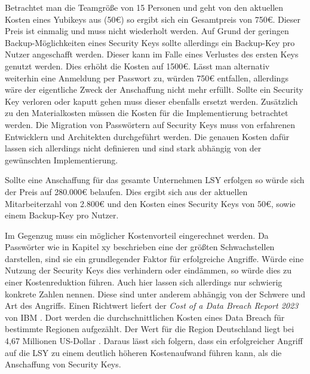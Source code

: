 Betrachtet man die Teamgröße von 15 Personen und geht von den aktuellen Kosten eines Yubikeys aus (50€) so ergibt sich ein Gesamtpreis von 750€. Dieser Preis ist einmalig und muss nicht wiederholt werden. Auf Grund der geringen Backup-Möglichkeiten eines Security Keys sollte allerdings ein Backup-Key pro Nutzer angeschafft werden. Dieser kann im Falle eines Verlustes des ersten Keys genutzt werden. Dies erhöht die Kosten auf 1500€.
Lässt man alternativ weiterhin eine Anmeldung per Passwort zu, würden 750€ entfallen, allerdings wäre der eigentliche Zweck der Anschaffung nicht mehr erfüllt.
Sollte ein Security Key verloren oder kaputt gehen muss dieser ebenfalls ersetzt werden.
Zusätzlich zu den Materialkosten müssen die Kosten für die Implementierung betrachtet werden. Die Migration von Passwörtern auf Security Keys muss von erfahrenen Entwicklern und Architekten durchgeführt werden. Die genauen Kosten dafür lassen sich allerdings nicht definieren und sind stark abhängig von der gewünschten Implementierung. 

Sollte eine Anschaffung für das gesamte Unternehmen \ac{LSY} erfolgen so würde sich der Preis auf 280.000€ belaufen. Dies ergibt sich aus der aktuellen Mitarbeiterzahl von 2.800€ und den Kosten eines Security Keys von 50€, sowie einem Backup-Key pro Nutzer.

Im Gegenzug muss ein möglicher Kostenvorteil eingerechnet werden. Da Passwörter wie in Kapitel xy beschrieben eine der größten Schwachstellen darstellen, sind sie ein grundlegender Faktor für erfolgreiche Angriffe. Würde eine Nutzung der Security Keys dies verhindern oder eindämmen, so würde dies zu einer Kostenreduktion führen. Auch hier lassen sich allerdings nur schwierig konkrete Zahlen nennen. Diese sind unter anderem abhängig von der Schwere und Art des Angriffs. Einen Richtwert liefert der \textit{Cost of a Data Breach Report 2023} von IBM \cite{databreach}. Dort werden die durchschnittlichen Kosten eines Data Breach für bestimmte Regionen aufgezählt. Der Wert für die Region Deutschland liegt bei 4,67 Millionen US-Dollar \cite{databreach}. Daraus lässt sich folgern, dass ein erfolgreicher Angriff auf die \ac{LSY} zu einem deutlich höheren Kostenaufwand führen kann, als die Anschaffung von Security Keys.
